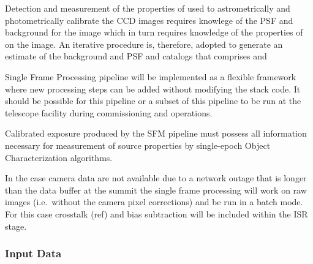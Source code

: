 Detection and measurement of the properties of \Sources used to astrometrically and photometrically calibrate the CCD images requires knowlege of the PSF and background for the image which in turn requires knowledge of the properties of \Sources on the image. An iterative procedure is, therefore, adopted to generate an estimate of the background and PSF and \Source catalogs that comprises \hyperref[sec:apPSFBackground]{}  and \hyperref[sec:apSourcemeasurement]{}

Single Frame Processing pipeline will be implemented as a flexible framework where new processing steps can be added without modifying the stack code. It should be possible for this pipeline or a subset of this pipeline to be run at the telescope facility during commissioning and operations.  


Calibrated exposure produced by the SFM pipeline must possess all information necessary for measurement of source properties by single-epoch Object Characterization algorithms.

 In the case camera data are not available due to a network outage that is longer than the data buffer at the summit the single frame processing will work on raw images (i.e.\ without the camera pixel corrections) and be run in a batch mode. For this case crosstalk (ref) and bias subtraction will be included within the ISR stage.

\subsubsection{Input Data}
\label{sec:apSFMInput}


